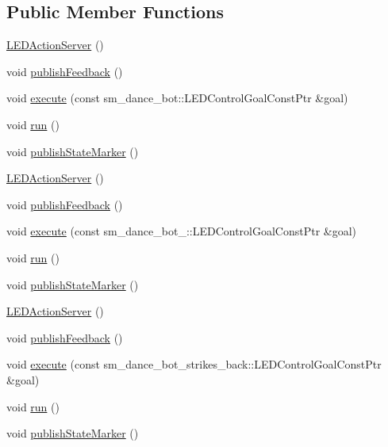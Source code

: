 \subsection*{Public Member Functions}
\begin{DoxyCompactItemize}
\item 
\hyperlink{classLEDActionServer_a6978c43940438b9fd8bfcd6b443092d3}{L\+E\+D\+Action\+Server} ()
\item 
void \hyperlink{classLEDActionServer_a25c93d4e7ecdacbb4f5b090d7789aa36}{publish\+Feedback} ()
\item 
void \hyperlink{classLEDActionServer_a2d8b9dfca1912e24170ef69a5edf5e9b}{execute} (const sm\+\_\+dance\+\_\+bot\+::\+L\+E\+D\+Control\+Goal\+Const\+Ptr \&goal)
\item 
void \hyperlink{classLEDActionServer_ae8e1b2d4bf0a85eec3ffd1c7d4f08490}{run} ()
\item 
void \hyperlink{classLEDActionServer_a73bb754ac2347c50660624ad92315895}{publish\+State\+Marker} ()
\item 
\hyperlink{classLEDActionServer_a6978c43940438b9fd8bfcd6b443092d3}{L\+E\+D\+Action\+Server} ()
\item 
void \hyperlink{classLEDActionServer_a25c93d4e7ecdacbb4f5b090d7789aa36}{publish\+Feedback} ()
\item 
void \hyperlink{classLEDActionServer_ae7cf81f53d16e3bdb5142df60b2017b3}{execute} (const sm\+\_\+dance\+\_\+bot\+\_\+::\+L\+E\+D\+Control\+Goal\+Const\+Ptr \&goal)
\item 
void \hyperlink{classLEDActionServer_ae8e1b2d4bf0a85eec3ffd1c7d4f08490}{run} ()
\item 
void \hyperlink{classLEDActionServer_a73bb754ac2347c50660624ad92315895}{publish\+State\+Marker} ()
\item 
\hyperlink{classLEDActionServer_a6978c43940438b9fd8bfcd6b443092d3}{L\+E\+D\+Action\+Server} ()
\item 
void \hyperlink{classLEDActionServer_a25c93d4e7ecdacbb4f5b090d7789aa36}{publish\+Feedback} ()
\item 
void \hyperlink{classLEDActionServer_aea69ee96367e9f6a82d6302f148505d6}{execute} (const sm\+\_\+dance\+\_\+bot\+\_\+strikes\+\_\+back\+::\+L\+E\+D\+Control\+Goal\+Const\+Ptr \&goal)
\item 
void \hyperlink{classLEDActionServer_ae8e1b2d4bf0a85eec3ffd1c7d4f08490}{run} ()
\item 
void \hyperlink{classLEDActionServer_a73bb754ac2347c50660624ad92315895}{publish\+State\+Marker} ()
\item 

\end{DoxyCompactItemize}
